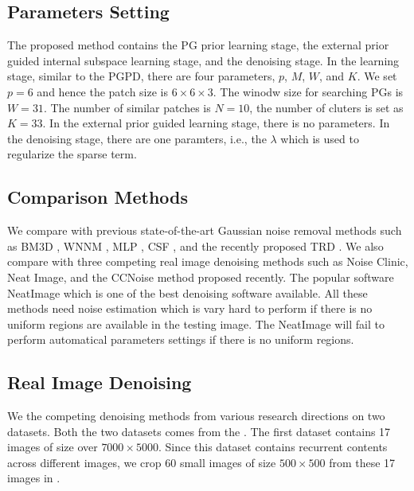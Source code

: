 \documentclass[10pt,twocolumn,letterpaper]{article}
\begin{document}
\subsection{Parameters Setting}
The proposed method contains the PG prior learning stage, the external prior guided internal subspace learning stage, and the denoising stage. In the learning stage, similar to the PGPD, there are four parameters, $p$, $M$, $W$, and $K$.  We set $p=6$ and hence the patch size is $6\times 6 \times 3$. The winodw size for searching PGs is $W = 31$. The number of similar patches is $N=10$, the number of cluters is set as $K = 33$. In the external prior guided learning stage, there is no parameters. In the denoising stage, there are one paramters, i.e., the $\lambda$ which is used to regularize the sparse term.

\subsection{Comparison Methods}
We compare with previous state-of-the-art Gaussian noise removal methods such as BM3D \cite{bm3d}, WNNM \cite{wnnm}, MLP \cite{mlp}, CSF \cite{csf}, and the recently proposed TRD \cite{chencvpr2015}. We also compare with three competing real image denoising methods such as Noise Clinic, Neat Image, and the CCNoise method proposed recently. The popular software NeatImage which is one of the best denoising software available. All these methods need noise estimation which is vary hard to perform if there is no uniform regions are available in the testing image. The NeatImage will fail to perform automatical parameters settings if there is no uniform regions.

\subsection{Real Image Denoising}
We  the competing denoising methods from various research directions on two datasets. Both the two datasets comes from the \cite{crosschannel2016}. The first dataset contains 17 images of size over $7000\times5000$. Since this dataset contains recurrent contents across different images, we crop 60 small images of size $500\times500$ from these 17 images in \cite{crosschannel2016}.
\end{document}
